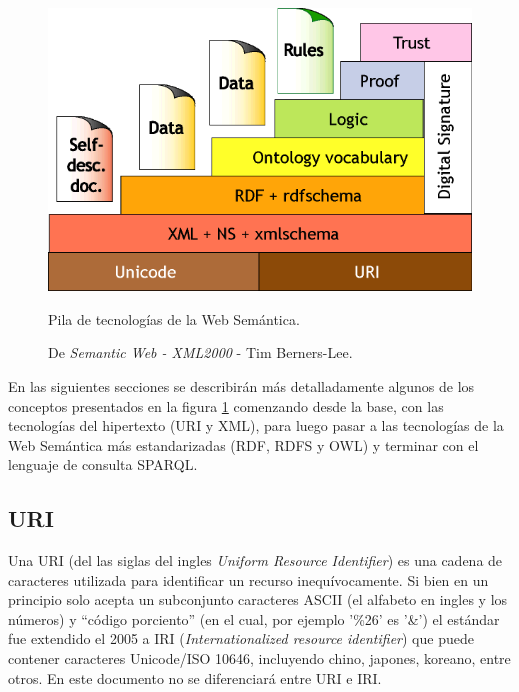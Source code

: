 \begin{figure}[htpb]
  \centering
  \includegraphics[width=.6\textwidth]{figures/Semantic_web_stack.png}
  \caption{Pila de tecnologías de la Web Semántica.}
  \vspace{-.25cm}
  \caption*{De \emph{Semantic Web - XML2000} - Tim
            Berners-Lee\cite{img:swstack}.}
  \label{fig:swstack}
\end{figure}

En las siguientes secciones se describirán más detalladamente algunos de los
conceptos presentados en la figura \ref{fig:swstack} comenzando desde la base,
con las tecnologías del hipertexto (URI y XML), para luego pasar a las
tecnologías de la Web Semántica más estandarizadas (RDF, RDFS y OWL) y terminar
con el lenguaje de consulta SPARQL.

\subsection{URI}
Una URI (del las siglas del ingles \emph{Uniform Resource Identifier}) es una
cadena de caracteres utilizada para identificar un recurso inequívocamente.
Si bien en un principio solo acepta un subconjunto caracteres ASCII (el alfabeto
en ingles y los números) y ``código porciento'' (en el cual, por ejemplo '\%26'
es '\&') el estándar fue extendido el 2005 a IRI (\emph{Internationalized
resource identifier}) que puede contener caracteres Unicode/ISO 10646,
incluyendo chino, japones, koreano, entre otros\cite{gangemi2006bourne}.
En este documento no se diferenciará entre URI e IRI.

